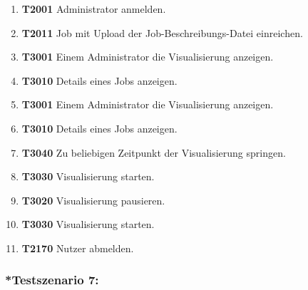 \begin{enumerate}
    \item \textbf{T2001} \gls{Administrator} anmelden.
    
    \item \textbf{T2011} Job mit Upload der Job-Beschreibungs-Datei einreichen. 
    
    \item \textbf{T3001} Einem Administrator die Visualisierung anzeigen. 
    
    \item \textbf{T3010} Details eines Jobs anzeigen.
    
    \item \textbf{T3001} Einem Administrator die Visualisierung anzeigen. 
    
    \item \textbf{T3010} Details eines Jobs anzeigen.
    
    \item \textbf{T3040} Zu beliebigen Zeitpunkt der Visualisierung springen.
    
    \item \textbf{T3030} Visualisierung starten. 
    
    \item \textbf{T3020} Visualisierung pausieren. 
    
    \item \textbf{T3030} Visualisierung starten. 
    
    \item \textbf{T2170} \gls{Nutzer} abmelden.
\end{enumerate}

\subsubsection{*Testszenario 7: }





	